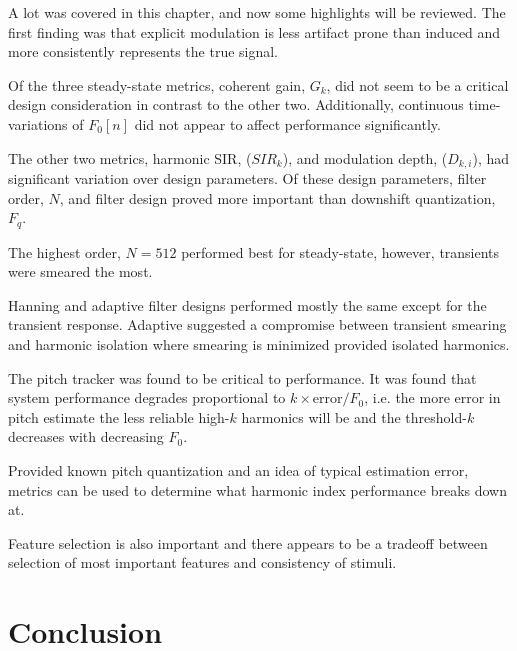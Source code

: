 \documentclass [11pt, proquest,oneside] {ganter_thesis}[2015/03/03]
\begin{document}
A lot was covered in this chapter, and now some highlights will be reviewed.  The first finding was that explicit modulation is less artifact prone than induced and more consistently represents the true signal.

Of the three steady-state metrics, coherent gain, $G_k$, did not seem to be a critical design consideration in contrast to the other two.  Additionally, continuous time-variations of $F_0[n]$ did not appear to affect performance significantly.

The other two metrics, harmonic SIR, ($SIR_k$), and modulation depth, ($D_{k,i}$), had significant variation over design parameters.  Of these design parameters, filter order, $N$, and filter design proved more important than downshift quantization, $F_q$.

The highest order, $N = 512$ performed best for steady-state, however, transients were smeared the most.

Hanning and adaptive filter designs performed mostly the same except for the transient response.  Adaptive suggested a compromise between transient smearing and harmonic isolation where smearing is minimized provided isolated harmonics.

The pitch tracker was found to be critical to performance.  It was found that system performance degrades proportional to $k \times \mathrm{error} / F_0$, i.e. the more error in pitch estimate the less reliable high-$k$ harmonics will be and the threshold-$k$ decreases with decreasing $F_0$.

Provided known pitch quantization and an idea of typical estimation error, metrics can be used to determine what harmonic index performance breaks down at.

Feature selection is also important and there appears to be a tradeoff between selection of most important features and consistency of stimuli.



\chapter{Conclusion}\label{ch:conclusion}
\end{document}
